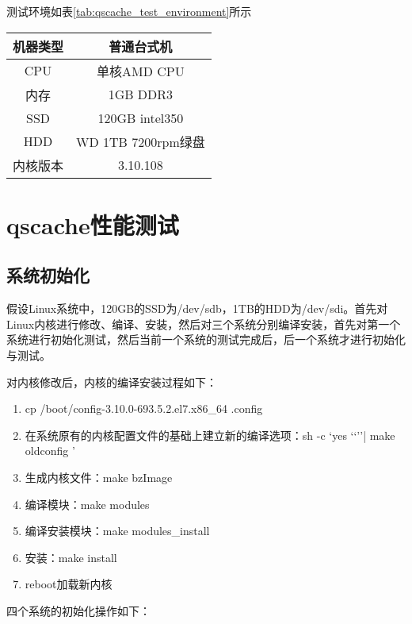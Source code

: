 测试环境如表\ref{tab:qscache_test_environment}所示

\begin{table}[!hpb]
    \centering
    \begin{tabular}{cc} \toprule
      机器类型 & 普通台式机 \\ \midrule
      CPU & 单核AMD CPU\\
      内存 & 1GB DDR3\\
      SSD & 120GB intel350 \\
      HDD & WD 1TB 7200rpm绿盘\\
      内核版本 & 3.10.108\\
      \bottomrule
    \end{tabular}
\end{table}

\section{qscache性能测试}

\subsection{系统初始化}

假设Linux系统中，120GB的SSD为/dev/sdb，1TB的HDD为/dev/sdi。首先对Linux内核进行修改、编译、安装，然后对三个系统分别编译安装，首先对第一个系统进行初始化测试，然后当前一个系统的测试完成后，后一个系统才进行初始化与测试。

对内核修改后，内核的编译安装过程如下：

\begin{enumerate}
    \item cp /boot/config-3.10.0-693.5.2.el7.x86\_64 .config
    \item 在系统原有的内核配置文件的基础上建立新的编译选项：sh -c \lq yes \lq\lq\rq\rq | make oldconfig \rq
    \item 生成内核文件：make bzImage
    \item 编译模块：make modules
    \item 编译安装模块：make modules\_install
    \item 安装：make install
    \item reboot加载新内核
\end{enumerate}

四个系统的初始化操作如下：

